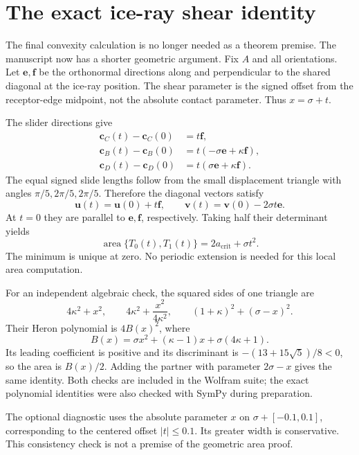 \documentclass[11pt,a4paper]{article}
\newcommand{\code}[1]{\texttt{\detokenize{#1}}}
\newcommand{\ak}{a_{\mathrm{crit}}}\newcommand{\amin}{a_{\min}}
\newcommand{\area}{\operatorname{area}}\newcommand{\arc}{\operatorname{arc}}
\newcommand{\cc}{\mathbf c}\newcommand{\RR}{\mathbb R}\newcommand{\ZZ}{\mathbb Z}
\theoremstyle{remark}\newtheorem*{contract}{Implementation contract}\newtheorem*{auditnote}{Audit note}
\begin{document}


\section{The exact ice-ray shear identity}

The final convexity calculation is no longer needed as a theorem premise.
The manuscript now has a shorter geometric argument. Fix $A$ and all
orientations. Let $\mathbf e,\mathbf f$ be the orthonormal directions along
and perpendicular to the shared diagonal at the ice-ray position. The shear
parameter is the signed offset from the receptor-edge midpoint, not the
absolute contact parameter. Thus $x=\sigma+t$.

The slider directions give
\[
\begin{split}
\cc_C(t)-\cc_C(0)&=t\mathbf f,\\
\cc_B(t)-\cc_B(0)&=t(-\sigma\mathbf e+\kappa\mathbf f),\\
\cc_D(t)-\cc_D(0)&=t(\sigma\mathbf e+\kappa\mathbf f).
\end{split}
\]
The equal signed slide lengths follow from the small displacement triangle
with angles $\pi/5,2\pi/5,2\pi/5$. Therefore the diagonal vectors satisfy
\[
\mathbf u(t)=\mathbf u(0)+t\mathbf f,\qquad
\mathbf v(t)=\mathbf v(0)-2\sigma t\mathbf e.
\]
At $t=0$ they are parallel to $\mathbf e,\mathbf f$, respectively. Taking
half their determinant yields
\[
\boxed{\area\{T_0(t),T_1(t)\}=2\ak+\sigma t^2.}
\]
The minimum is unique at zero. No periodic extension is needed for this local
area computation.

For an independent algebraic check, the squared sides of one triangle are
\[
4\kappa^2+x^2,\qquad
4\kappa^2+\frac{x^2}{4\kappa^2},\qquad
(1+\kappa)^2+(\sigma-x)^2.
\]
Their Heron polynomial is $4B(x)^2$, where
\[
B(x)=\sigma x^2+(\kappa-1)x+\sigma(4\kappa+1).
\]
Its leading coefficient is positive and its discriminant is
$-(13+15\sqrt5)/8<0$, so the area is $B(x)/2$. Adding the partner with
parameter $2\sigma-x$ gives the same identity. Both checks are included in
the Wolfram suite; the exact polynomial identities were also checked with
SymPy during preparation.

The optional \code{one_dimer2} diagnostic uses the absolute parameter
$x$ on $\sigma+[-0.1,0.1]$, corresponding to the centered offset
$|t|\le0.1$. Its greater width is conservative. This consistency check is not
a premise of the geometric area proof.
\end{document}
